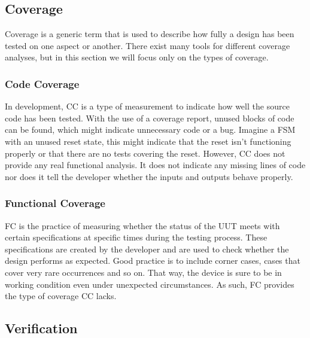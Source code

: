 \documentclass[11pt,british]{article}
\begin{document}
\subsection{Coverage}
Coverage is a generic term that is used to describe how fully a design has been tested on one aspect or another. There exist many tools for different coverage analyses, but in this section we will focus only on the types of coverage.

\subsubsection{Code Coverage}
In development, \gls{CC} is a type of measurement to indicate how well the source code has been tested. With the use of a coverage report, unused blocks of code can be found, which might indicate unnecessary code or a bug. Imagine a \gls{FSM} with an unused reset state, this might indicate that the reset isn't functioning properly or that there are no tests covering the reset. However, CC does not provide any real functional analysis. It does not indicate any missing lines of code nor does it tell the developer whether the inputs and outputs behave properly.\cite{coverage1,coverage2}

\subsubsection{Functional Coverage}
\gls{FC} is the practice of measuring whether the status of the \gls{UUT} meets with certain specifications at specific times during the testing process. These specifications are created by the developer and are used to check whether the design performs as expected. Good practice is to include corner cases, cases that cover very rare occurrences and so on. That way, the device is sure to be in working condition even under unexpected circumstances. As such, FC provides the type of coverage CC lacks.\cite{functional1,functional2}

\subsection{Verification}
\end{document}
